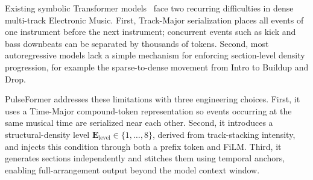 \documentclass[11pt,twocolumn,a4paper]{article}
\begin{document}
Existing symbolic Transformer models~\cite{vaswani2017attention,hsiao2021compound,ens2020mmm} face two recurring difficulties in dense multi-track Electronic Music. First, Track-Major serialization places all events of one instrument before the next instrument; concurrent events such as kick and bass downbeats can be separated by thousands of tokens. Second, most autoregressive models lack a simple mechanism for enforcing section-level density progression, for example the sparse-to-dense movement from Intro to Buildup and Drop.

PulseFormer addresses these limitations with three engineering choices. First, it uses a Time-Major compound-token representation so events occurring at the same musical time are serialized near each other. Second, it introduces a structural-density level $\mathbf{E}_{\mathrm{level}}\in\{1,\ldots,8\}$, derived from track-stacking intensity, and injects this condition through both a prefix token and FiLM. Third, it generates sections independently and stitches them using temporal anchors, enabling full-arrangement output beyond the model context window.
\end{document}
